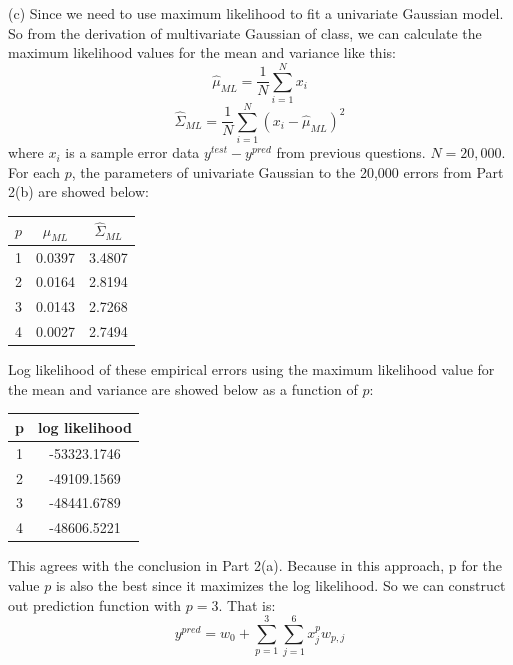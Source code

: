 \documentclass{article}
\begin{document}
\FloatBarrier\\\\
(c) Since we need to use maximum likelihood to fit a univariate Gaussian model. So from the derivation of multivariate Gaussian of class, we can calculate the maximum likelihood values for the mean and variance like this:\\
$$\hat{\mu}_{ML} = \frac{1}{N}\displaystyle \sum_{i=1}^{N}x_i$$
$$\hat{\Sigma}_{ML} = \frac{1}{N}\displaystyle \sum_{i=1}^{N}(x_i - \hat{\mu}_{ML})^2$$
where $x_i$ is a sample error data $y^{test} - y^{pred}$ from previous questions. $N = 20,000$.\\
For each $p$, the parameters of univariate Gaussian to the 20,000 errors from Part 2(b) are showed below:
\FloatBarrier
\begin{table}[h!]
\centering
\begin{tabular}{|c|c|c|}
\hline
$p$&  $\hat{\mu}_{ML}$   &   $\hat{\Sigma}_{ML}$\\
\hline
1&0.0397&   3.4807\\
\hline
2&0.0164&   2.8194\\
\hline
3&0.0143&   2.7268\\
\hline
4&0.0027&   2.7494\\
\hline
\end{tabular}
\end{table}
\FloatBarrier
Log likelihood of these empirical errors using the maximum likelihood value for the mean and variance are showed below as a function of $p$:
\FloatBarrier
\begin{table}[h!]
\centering
\begin{tabular}{|c|c|}
\hline
p&  log likelihood\\
\hline
1&-53323.1746\\
\hline
2&-49109.1569\\
\hline
3&-48441.6789\\
\hline
4&-48606.5221\\
\hline
\end{tabular}
\end{table}
\FloatBarrier
This agrees with the conclusion in Part 2(a). Because in this approach, p for the value $p$ is also the best since it maximizes the log likelihood. So we can construct out prediction function with $p = 3$. That is:
$$y^{pred} = w_{0} + \sum_{p=1}^{3}\sum_{j=1}^{6}x_{j}^{p}w_{p,j}$$
\end{document}
